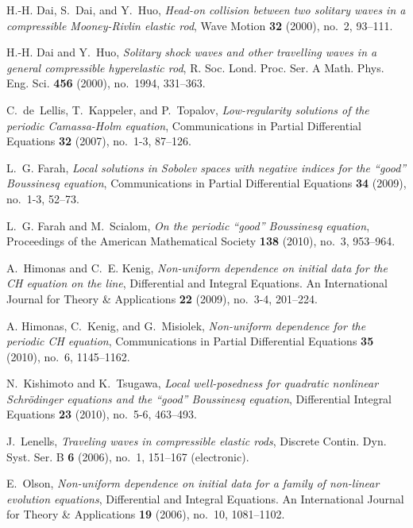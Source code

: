 \documentclass[12pt,reqno]{amsart}
\begin{document}
\begin{thebibliography}{dLKT07}
H.-H. Dai, S.~Dai, and Y.~Huo, \emph{{Head-on collision between two solitary
  waves in a compressible Mooney-Rivlin elastic rod}}, Wave Motion \textbf{32}
  (2000), no.~2, 93--111.

H.-H. Dai and Y.~Huo, \emph{{Solitary shock waves and other travelling waves in
  a general compressible hyperelastic rod}}, R. Soc. Lond. Proc. Ser. A Math.
  Phys. Eng. Sci. \textbf{456} (2000), no.~1994, 331--363.

C.~de~Lellis, T.~Kappeler, and P.~Topalov, \emph{{Low-regularity solutions of
  the periodic Camassa-Holm equation}}, Communications in Partial Differential
  Equations \textbf{32} (2007), no.~1-3, 87--126.

L.~G. Farah, \emph{{Local solutions in Sobolev spaces with negative indices for
  the ``good'' Boussinesq equation}}, Communications in Partial Differential
  Equations \textbf{34} (2009), no.~1-3, 52--73.

L.~G. Farah and M.~Scialom, \emph{{On the periodic ``good'' Boussinesq
  equation}}, Proceedings of the American Mathematical Society \textbf{138}
  (2010), no.~3, 953--964.

A.~Himonas and C.~E. Kenig, \emph{{Non-uniform dependence on initial data for
  the CH equation on the line}}, Differential and Integral Equations. An
  International Journal for Theory \& Applications \textbf{22} (2009),
  no.~3-4, 201--224.

A. Himonas, C.~Kenig, and G.~Misiolek, \emph{{Non-uniform dependence for
  the periodic CH equation}}, Communications in Partial Differential Equations
  \textbf{35} (2010), no.~6, 1145--1162.
  
N.~Kishimoto and K.~Tsugawa, \emph{Local well-posedness for quadratic nonlinear
  {S}chr{\"o}dinger equations and the ``good'' {B}oussinesq equation},
  Differential Integral Equations \textbf{23} (2010), no.~5-6, 463--493.
  

J.~Lenells, \emph{{Traveling waves in compressible elastic rods}}, Discrete
  Contin. Dyn. Syst. Ser. B \textbf{6} (2006), no.~1, 151--167 (electronic).

E.~Olson, \emph{{Non-uniform dependence on initial data for a family of
  non-linear evolution equations}}, Differential and Integral Equations. An
  International Journal for Theory \& Applications \textbf{19} (2006),
  no.~10, 1081--1102.

\end{thebibliography}
%
%
\end{document}

